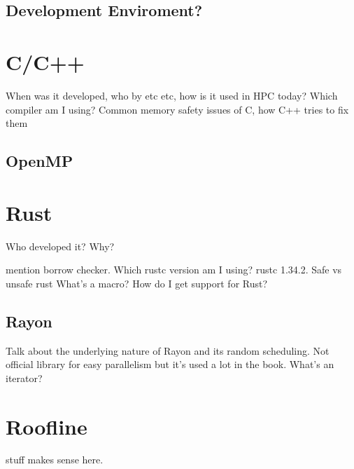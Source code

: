 \subsection{Development Enviroment?}

\section{C/C++}
When was it developed, who by etc etc, how is it used in HPC today? Which compiler am I using? Common memory safety issues of C, how C++ tries to fix them
\subsection{OpenMP}

\section{Rust}
Who developed it? Why?

mention borrow checker. Which rustc version am I using? rustc 1.34.2. Safe vs unsafe rust
What's a macro?
How do I get support for Rust?
\subsection{Rayon}
Talk about the underlying nature of Rayon and its random scheduling. Not official library for easy parallelism but it's used a lot in the book.
What's an iterator?
\section{Roofline} stuff makes sense here.
